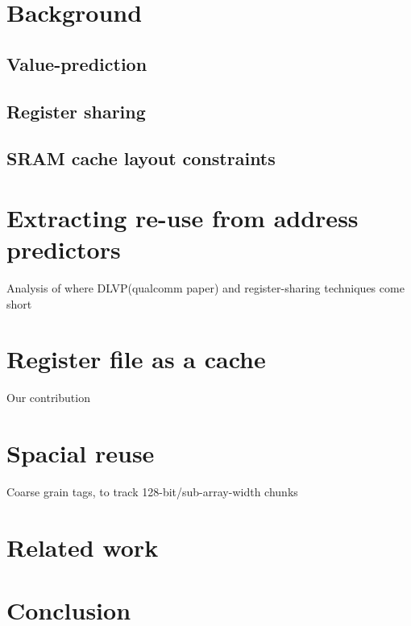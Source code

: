 \documentclass{sig-alternate}
\begin{document}
\section{Background}
\subsection{Value-prediction}
\subsection{Register sharing}
\subsection{SRAM cache layout constraints}


\section{Extracting re-use from address predictors}
Analysis of where DLVP(qualcomm paper) and register-sharing techniques come short

\section{Register file as a cache}
Our contribution

\section{Spacial reuse}
Coarse grain tags, to track 128-bit/sub-array-width chunks

\section{Related work}

\section{Conclusion}




\end{document}
